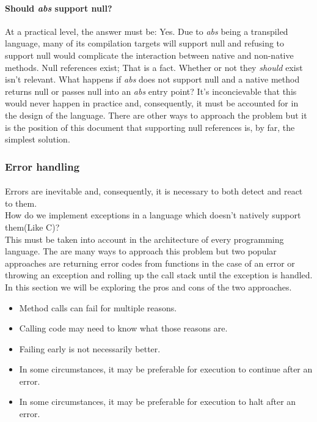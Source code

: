 \documentclass[hidelinks]{article}
\begin{document}
\paragraph{Should \textit{abs} support null?}At a practical level, the answer must be: Yes. Due to \textit{abs} being a transpiled language, many of its compilation targets will support null and refusing to support null would complicate the interaction between native and non-native methods. Null references exist; That is a fact. Whether or not they \textit{should} exist isn't relevant. What happens if \textit{abs} does not support null and a native method returns null or passes null into an \textit{abs} entry point? It's inconcievable that this would never happen in practice and, consequently, it must be accounted for in the design of the language. There are other ways to approach the problem but it is the position of this document that supporting null references is, by far, the simplest solution.

\subsubsection{Error handling}
\paragraph{}Errors are inevitable and, consequently, it is necessary to both detect and react to them. 
\\
How do we implement exceptions in a language which doesn't natively support them(Like C)?
\\
This must be taken into account in the architecture of every programming language. The are many ways to approach this problem but two popular approaches are returning error codes from functions in the case of an error or throwing an exception and rolling up the call stack until the exception is handled. In this section we will be exploring the pros and cons of the two approaches.

\begin{itemize}
\item Method calls can fail for multiple reasons.
\item Calling code may need to know what those reasons are.
\item Failing early is not necessarily better.
\item In some circumstances, it may be preferable for execution to continue after an error.
\item In some circumstances, it may be preferable for execution to halt after an error.
\end{itemize}
\end{document}
